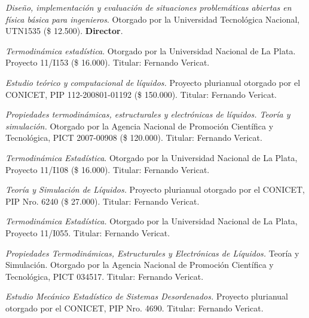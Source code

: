  \textit{Diseño, implementación y evaluación de situaciones problemáticas abiertas en física básica para ingenieros}. Otorgado por la Universidad Tecnológica Nacional, UTN1535 (\$ 12.500). \textbf{Director}.

 \textit{Termodinámica estadística}. Otorgado por la Universidad Nacional de La Plata. Proyecto 11/I153 (\$ 16.000). Titular: Fernando Vericat. 

 \textit{Estudio teórico y computacional de líquidos.} Proyecto plurianual otorgado por el CONICET, PIP  112-200801-01192 (\$ 150.000). Titular: Fernando Vericat.

 \textit{Propiedades termodinámicas, estructurales y electrónicas de líquidos. Teoría y simulación.} Otorgado por la Agencia Nacional de Promoción Científica y Tecnológica, PICT 2007-00908 (\$ 120.000). Titular: Fernando Vericat.

 \textit{Termodinámica Estadística}. Otorgado por la Universidad Nacional de La Plata, Proyecto 11/I108 (\$ 16.000). Titular: Fernando Vericat.

 \textit{Teoría y Simulación de Líquidos.} Proyecto plurianual otorgado por el CONICET, PIP Nro. 6240 (\$ 27.000). Titular: Fernando Vericat.

 \textit{Termodinámica Estadística.} Otorgado por la Universidad Nacional de La Plata, Proyecto 11/I055. Titular: Fernando Vericat.

 \textit{Propiedades Termodinámicas, Estructurales y Electrónicas de Líquidos.} Teoría y Simulación. Otorgado por la Agencia Nacional de Promoción Científica y Tecnológica, PICT 034517. Titular: Fernando Vericat.

 \textit{Estudio Mecánico Estadístico de Sistemas Desordenados.} Proyecto plurianual otorgado por el CONICET, PIP Nro. 4690. Titular: Fernando Vericat.
